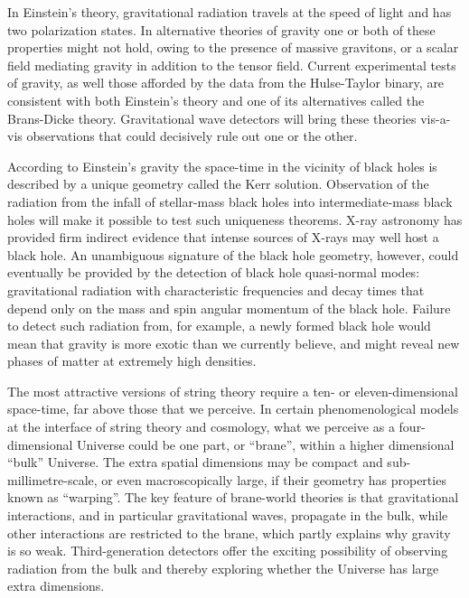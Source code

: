 In Einstein's theory, gravitational radiation travels at the speed 
of light and has two polarization states. In alternative theories 
of gravity one or both of these properties might not hold, owing 
to the presence of massive gravitons, or a scalar field mediating 
gravity in addition to the tensor field. Current experimental
tests of gravity, as well those afforded by the data from the
Hulse-Taylor binary, are consistent with both Einstein's theory
and one of its alternatives called the Brans-Dicke theory.
Gravitational wave detectors will bring these theories
vis-a-vis observations that could decisively rule out one
or the other.

According to Einstein's gravity the space-time in the vicinity
of black holes is described by a unique geometry called the
Kerr solution. Observation of the radiation from the infall
of stellar-mass black holes into intermediate-mass black holes
will make it possible to test such uniqueness theorems. X-ray
astronomy has provided firm indirect evidence that intense
sources of X-rays may well host a black hole. An unambiguous
signature of the black hole geometry, however, could eventually
be provided by the detection of black hole quasi-normal modes:
gravitational radiation with characteristic frequencies and decay
times that depend only on the mass and spin angular momentum of the black hole.
Failure to detect such radiation from, for example, a newly
formed black hole would mean that gravity is more exotic than
we currently believe,
and might reveal new phases of matter at extremely high densities.

The most attractive versions of string theory require a ten- or
eleven-dimensional space-time, far above those that we perceive.
In certain phenomenological models at the interface of string
theory and cosmology, what we perceive as a four-dimensional
Universe could be one part, or ``brane'', within a higher
dimensional ``bulk'' Universe. The extra spatial dimensions may
be compact and sub-millimetre-scale,
or even macroscopically large, if their geometry has
properties known as ``warping''. The key feature of brane-world
theories is that gravitational interactions, and in particular
gravitational waves, propagate in the bulk, while other interactions
are restricted to the brane, which partly explains why gravity is
so weak. 
Third-generation detectors offer 
the exciting possibility of observing radiation from the bulk and 
thereby exploring whether the Universe has large extra dimensions.



